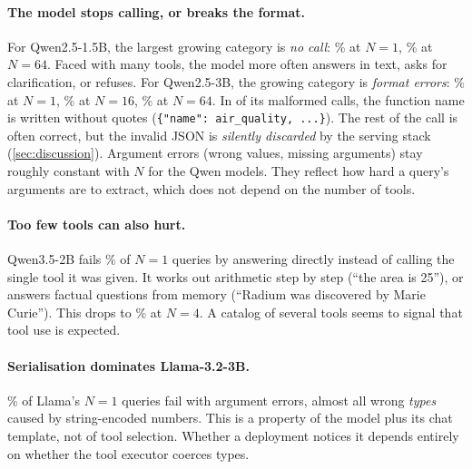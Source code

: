 \paragraph{The model stops calling, or breaks the format.}
For Qwen2.5-1.5B, the largest growing category is \emph{no call}: \FailNoCallQwenOneFiveNOne\% at $N{=}1$, \FailNoCallQwenOneFiveNSixtyFour\% at $N{=}64$. Faced with many tools, the model more often answers in text, asks for clarification, or refuses.
For Qwen2.5-3B, the growing category is \emph{format errors}: \FailFormatQwenThreeNOne\% at $N{=}1$, \FailFormatQwenThreeNSixteen\% at $N{=}16$, \FailFormatQwenThreeNSixtyFour\% at $N{=}64$. In \MalformedUnquotedQwenThree{} of its \MalformedNQwenThree{} malformed calls, the function name is written without quotes (\texttt{\{"name": air\_quality, ...\}}). The rest of the call is often correct, but the invalid JSON is \emph{silently discarded} by the serving stack (\cref{sec:discussion}).
Argument errors (wrong values, missing arguments) stay roughly constant with $N$ for the Qwen models. They reflect how hard a query's arguments are to extract, which does not depend on the number of tools.

\paragraph{Too few tools can also hurt.}
Qwen3.5-2B fails \FailNoCallQwenThreeFiveNOne\% of $N{=}1$ queries by answering directly instead of calling the single tool it was given. It works out arithmetic step by step (``the area is 25''), or answers factual questions from memory (``Radium was discovered by Marie Curie''). This drops to \FailNoCallQwenThreeFiveNFour\% at $N{=}4$. A catalog of several tools seems to signal that tool use is expected.

\paragraph{Serialisation dominates Llama-3.2-3B.}
\FailArgLlamaNOne\% of Llama's $N{=}1$ queries fail with argument errors, almost all wrong \emph{types} caused by string-encoded numbers. This is a property of the model plus its chat template, not of tool selection. Whether a deployment notices it depends entirely on whether the tool executor coerces types.

